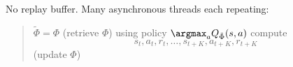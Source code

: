 {
No replay buffer.
Many asynchronous threads each repeating:
\vfill

  \begin{quotation}
  \noindent $\tilde{\Phi} = \Phi$ (retrieve $\Phi$)\newline \newline
  \noindent using policy $\argmax_a Q_{\tilde{\Phi}}(s,a)$ compute $$s_t,a_t,r_t,\ldots,s_{t+K},a_{t+K},r_{t+K}$$
  \newline
   (update $\Phi$)
  \end{quotation}


}



